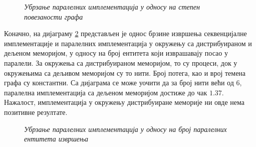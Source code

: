 \begin{figure}[H]
    \centering
    \caption{\textit{Убрзање паралелних имплементација у односу на степен повезаности графа}}
    \label{diagram:bfs-speedup-edge-numb-variable}
\end{figure}

Коначно, на дијаграму \ref{diagram:bfs-speedup-par-entity-numb-variable} представљен је однос брзине извршења секвенцијалне имплементације и паралелних имплементација у окружењу са дистрибуираном и дељеном меморијом, у односу на број ентитета који изврашавају посао у паралели. За окружења са дистрибуираном меморијом, то су процеси, док у окружењима са дељивом меморијом су то нити. Број потега, као и врој темена графа су константни. Са дијаграма се може уочити да за број нити већи од $6$, паралелна имплементација са дељеном меморијом достиже до чак $1.37$. Нажалост, имплементација у окружењу дистрибуиране меморије ни овде нема позитивне резултате.

\begin{figure}[H]
    \centering
    \caption{\textit{Убрзање паралелних имплементација у односу на број паралелних ентитета извршења}}
    \label{diagram:bfs-speedup-par-entity-numb-variable}
\end{figure}

